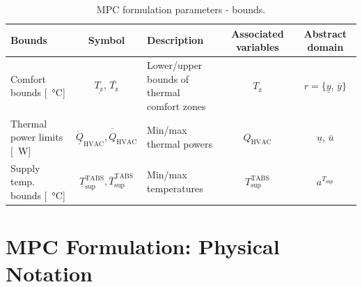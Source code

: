 \documentclass[10pt]{article}
\begin{document}
\begin{table}[!htbp]
	\centering
	\caption{MPC formulation parameters - bounds.}
	\label{tab:mpc_form:parameters:bounds}
	\begin{tabular}{l|c|l|c|c}
		\toprule
		\textbf{Bounds}  & \textbf{Symbol} &  \textbf{Description} & \textbf{Associated variables} & \textbf{Abstract domain}\\
		\midrule
		Comfort bounds [\SI{}{\celsius}] &  $\underline{T_{\text{z}}}$, $\overline{T_{\text{z}}}$ & \makecell[l]{Lower/upper  bounds of  \\ thermal comfort zones} & $T_{\text{z}}$ & $r = \{ \underline{y}$, $\overline{y}\}$\\
		Thermal power limits [\SI{}{\watt}] & $\underline{\dot{Q}}_{\text{HVAC}},\overline{\dot{Q}}_{\text{HVAC}}$ & Min/max thermal powers   & $Q_{\text{HVAC}}$ & $\underline{u}$, $\overline{u}$\\
		Supply temp. bounds [\SI{}{\celsius}] & $ \underline{T}_{\text{sup}}^{\text{TABS}} ,\overline{T}_{\text{sup}}^{\text{TABS}}$ & Min/max temperatures  & $T_{\text{sup}}^{\text{TABS}}$ & $a^{T_\text{sup}}$ \\
		\bottomrule 
	\end{tabular}
\end{table}


\section{MPC Formulation: Physical Notation}\label{sec:physical_notation}


\end{document}

